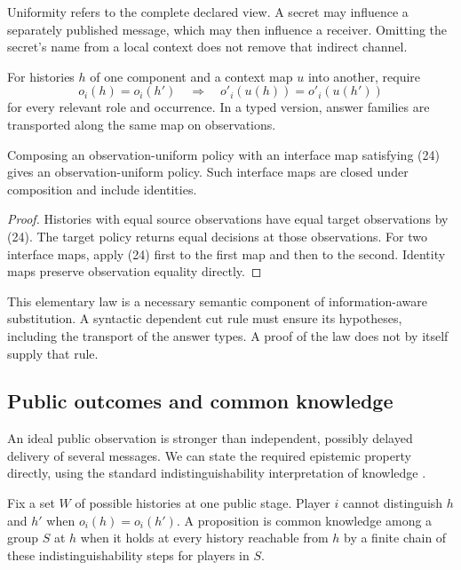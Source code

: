 Uniformity refers to the complete declared view. A secret may influence a
separately published message, which may then influence a receiver. Omitting
the secret's name from a local context does not remove that indirect channel.

\begin{definition}
For histories $h$ of one component and a context map $u$ into another, require
\[
 o_i(h)=o_i(h')\quad\Longrightarrow\quad
 o'_i(u(h))=o'_i(u(h'))
 \tag{24}
\]
for every relevant role and occurrence. In a typed version, answer families
are transported along the same map on observations.
\end{definition}

\begin{lemma}
\label{lem:view-composition}
Composing an observation-uniform policy with an interface map satisfying
(24) gives an observation-uniform policy. Such interface maps are closed
under composition and include identities.
\end{lemma}
\begin{proof}
Histories with equal source observations have equal target observations by
(24). The target policy returns equal decisions at those observations.
For two interface maps, apply (24) first to the first map and then to the
second. Identity maps preserve observation equality directly.
\end{proof}

This elementary law is a necessary semantic component of information-aware
substitution. A syntactic dependent cut rule must ensure its hypotheses,
including the transport of the answer types. A proof of the law does not by
itself supply that rule.

\subsection{Public outcomes and common knowledge}

An ideal public observation is stronger than independent, possibly delayed
delivery of several messages. We can state the required epistemic property
directly, using the standard indistinguishability interpretation of knowledge
\cite{HalpernMoses1990,BaltagMossSolecki1999}.

Fix a set $W$ of possible histories at one public stage. Player $i$ cannot
distinguish $h$ and $h'$ when $o_i(h)=o_i(h')$. A proposition is common
knowledge among a group $S$ at $h$ when it holds at every history reachable
from $h$ by a finite chain of these indistinguishability steps for players
in $S$.

